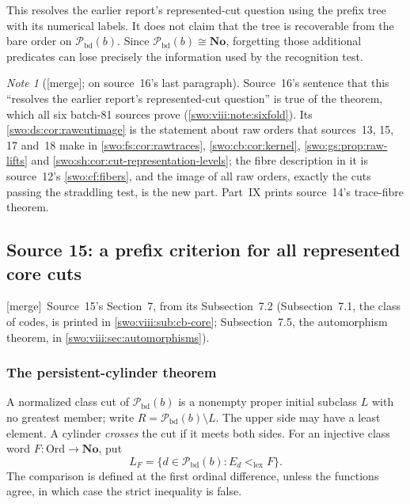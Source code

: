 \documentclass[11pt]{article}
\theoremstyle{definition}
\theoremstyle{remark}
\newtheorem{note}[note]{Note}
\newcommand{\No}{\mathbf{No}}
\newcommand{\Ord}{\mathrm{Ord}}
\newcommand{\Pbd}{\mathcal P_{\mathrm{bd}}}
\newcommand{\lex}{\mathrm{lex}}
\newcommand{\merge}{\textsf{[merge]}}
\begin{document}
This resolves the earlier report's represented-cut question using the
prefix tree with its numerical labels. It does not claim that the tree
is recoverable from the bare order on $\Pbd(b)$. Since $\Pbd(b)\cong\No$,
forgetting those additional predicates can lose precisely the information
used by the recognition test.

\begin{note}[\merge; on source~16's last paragraph]\label{swo:viii:note:ds-resolves}
Source~16's sentence that this ``resolves the earlier report's
represented-cut question'' is true of the theorem, which all six batch-81
sources prove (\cref{swo:viii:note:sixfold}). Its \cref{swo:ds:cor:rawcutimage}
is the statement about raw orders that sources~13, 15, 17 and~18 make in
\cref{swo:fs:cor:rawtraces}, \cref{swo:cb:cor:kernel},
\cref{swo:gs:prop:raw-lifts} and \cref{swo:sh:cor:cut-representation-levels};
the fibre description in it is source~12's \cref{swo:cf:fibers}, and the
image of all raw orders, exactly the cuts passing the straddling test, is the
new part. Part~IX prints source~14's trace-fibre theorem.
\end{note}

\subsection{Source 15: a prefix criterion for all represented core cuts}\label{swo:cb:sec:cuts}
\merge\ Source~15's Section~7, from its Subsection~7.2 (Subsection~7.1, the
class of codes, is printed in \cref{swo:viii:sub:cb-core}; Subsection~7.5,
the automorphism theorem, in \cref{swo:viii:sec:automorphisms}).

\subsubsection{The persistent-cylinder theorem}

A normalized class cut of $\Pbd(b)$ is a nonempty proper initial subclass
$L$ with no greatest member; write $R=\Pbd(b)\setminus L$. The upper side
may have a least element. A cylinder \emph{crosses} the cut if it meets
both sides. For an injective class word $F:\Ord\to\No$, put
\[
 L_F=\{d\in \Pbd(b):E_d<_{\lex}F\}.
\]
The comparison is defined at the first ordinal difference, unless the
functions agree, in which case the strict inequality is false.
\end{document}
